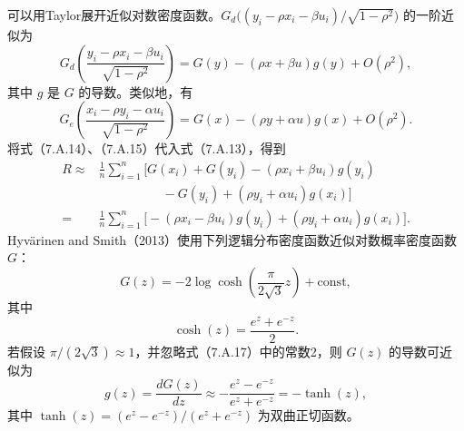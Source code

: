 可以用Taylor展开近似对数密度函数。$G_d\bigl((y_i-\rho x_i-\beta u_i)/\sqrt{1-\rho^2}\bigr)$ 的一阶近似为
\begin{equation}
G_d\left(\frac{y_i-\rho x_i-\beta u_i}{\sqrt{1-\rho^2}}\right)
 =G(y)-(\rho x+\beta u)g(y)+O(\rho^2),\tag{7.A.14}
\end{equation}
其中 $g$ 是 $G$ 的导数。类似地，有
\begin{equation}
G_e\left(\frac{x_i-\rho y_i-\alpha u_i}{\sqrt{1-\rho^2}}\right)
 =G(x)-(\rho y+\alpha u)g(x)+O(\rho^2).\tag{7.A.15}
\end{equation}
将式（7.A.14）、（7.A.15）代入式（7.A.13），得到
\begin{equation}
\begin{aligned}
R\approx{}&\frac1n\sum_{i=1}^n\bigl[G(x_i)+G(y_i)
 -(\rho x_i+\beta u_i)g(y_i)\\
&\hspace{5em}{}-G(y_i)+(\rho y_i+\alpha u_i)g(x_i)\bigr]\\
={}&\frac1n\sum_{i=1}^n\bigl[-(\rho x_i-\beta u_i)g(y_i)
 +(\rho y_i+\alpha u_i)g(x_i)\bigr].
\end{aligned}\tag{7.A.16}
\end{equation}
Hyvärinen and Smith（2013）使用下列逻辑分布密度函数近似对数概率密度函数 $G$：
\begin{equation}
G(z)=-2\log\cosh\left(\frac{\pi}{2\sqrt3}z\right)+\mathrm{const},\tag{7.A.17}
\end{equation}
其中
\[
\cosh(z)=\frac{e^z+e^{-z}}2.
\]
若假设 $\pi/(2\sqrt3)\approx1$，并忽略式（7.A.17）中的常数2，则 $G(z)$ 的导数可近似为
\begin{equation}
g(z)=\frac{dG(z)}{dz}\approx-\frac{e^z-e^{-z}}{e^z+e^{-z}}
 =-\tanh(z),\tag{7.A.18}
\end{equation}
其中 $\tanh(z)=(e^z-e^{-z})/(e^z+e^{-z})$ 为双曲正切函数。

